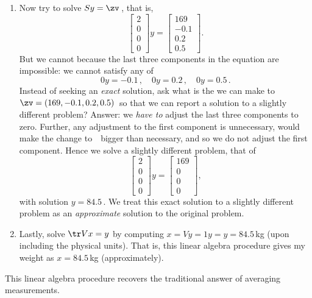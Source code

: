 \begin{example}
\begin{enumerate}
\item  Now try to solve \(Sy=\zv\)\,, that is,
\begin{equation*}
\begin{bmatrix} 2\\0\\0\\0 \end{bmatrix}y
=\begin{bmatrix} 169\\-0.1\\0.2\\0.5 \end{bmatrix}.
\end{equation*}
But we cannot because the last three components in the equation are impossible: we cannot satisfy any of
\begin{equation*}
0y=-0.1\,,\quad
0y=0.2\,,\quad
0y=0.5\,.
\end{equation*}
Instead of seeking an \emph{exact} solution, ask what is the \emph{} we can make to~\(\zv=(169,-0.1,0.2,0.5)\)\ so that we can report a solution to a slightly different problem?
Answer: we \emph{have to} adjust the last three components to zero. 
Further, any adjustment to the first component is unnecessary, would make the change to~\zv\ bigger than necessary, and so we do not adjust the first component.
Hence we solve a slightly different problem, that of
\begin{equation*}
\begin{bmatrix} 2\\0\\0\\0 \end{bmatrix}y
=\begin{bmatrix} 169\\0\\0\\0 \end{bmatrix},
\end{equation*}
with solution \(y=84.5\)\,.
We treat this exact solution to a slightly different problem as an \emph{approximate} solution to the original problem.

\item Lastly, solve \(\tr Vx=y\) by computing \(x=Vy=1y=y=84.5\)\,kg (upon including the physical units).
That is, this linear algebra procedure gives my weight as \(x=84.5\)\,kg (approximately).
\end{enumerate}
This linear algebra procedure recovers the traditional answer of averaging measurements.
\end{example}

